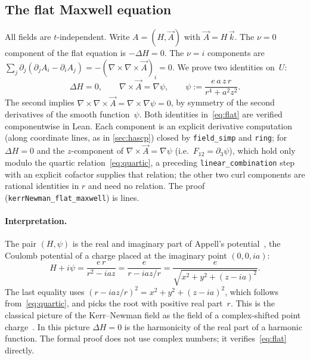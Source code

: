 \documentclass[11pt]{article}
\theoremstyle{definition}
\theoremstyle{remark}
\newcommand{\lean}[1]{\lstinline[basicstyle=\ttfamily\normalsize,columns=fullflexible,breaklines=false]{#1}}
\begin{document}
\subsection{The flat Maxwell equation}\label{sec:flat}

All fields are $t$-independent.
Write $A=(H,\vec A)$ with $\vec A=H\,\vec k$.
The $\nu=0$ component of the flat equation is $-\Delta H=0$.
The $\nu=i$ components are $\sum_j\partial_j(\partial_jA_i-\partial_iA_j)=-(\nabla\times\nabla\times\vec A)_i=0$.
We prove two identities on~$U$:
\begin{equation}\label{eq:flat}
  \Delta H=0,\qquad \nabla\times\vec A=\nabla\psi,\qquad \psi:=\frac{e\,a\,z\,r}{r^4+a^2z^2}.
\end{equation}
The second implies $\nabla\times\nabla\times\vec A=\nabla\times\nabla\psi=0$, by symmetry of the second derivatives of the smooth function~$\psi$.
Both identities in~\eqref{eq:flat} are verified componentwise in Lean.
Each component is an explicit derivative computation (along coordinate lines, as in \cref{sec:hascp}) closed by \lean{field_simp} and \lean{ring}; for $\Delta H=0$ and the $z$-component of $\nabla\times\vec A=\nabla\psi$ (i.e.\ $F_{12}=\partial_3\psi$), which hold only modulo the quartic relation~\eqref{eq:quartic}, a preceding \lean{linear_combination} step with an explicit cofactor supplies that relation; the other two curl components are rational identities in $r$ and need no relation.
The proof (\lean{kerrNewman_flat_maxwell}) is \NumLinesFlatMaxwell{} lines.

\paragraph{Interpretation.}
The pair $(H,\psi)$ is the real and imaginary part of Appell's potential~\cite{appell1887}, the Coulomb potential of a charge placed at the imaginary point $(0,0,ia)$:
\[
  H+i\psi=\frac{e\,r}{r^2-iaz}=\frac{e}{r-iaz/r}=\frac{e}{\sqrt{x^2+y^2+(z-ia)^2}} .
\]
The last equality uses $(r-iaz/r)^2=x^2+y^2+(z-ia)^2$, which follows from~\eqref{eq:quartic}, and picks the root with positive real part~$r$.
This is the classical picture of the Kerr--Newman field as the field of a complex-shifted point charge~\cite{newman1973,lyndenbell2003,adamo2014}.
In this picture $\Delta H=0$ is the harmonicity of the real part of a harmonic function.
The formal proof does not use complex numbers; it verifies~\eqref{eq:flat} directly.

\end{document}
